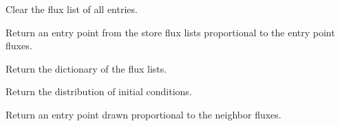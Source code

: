 \documentclass[letterpaper,10pt,english]{sphinxmanual}
\begin{document}
\begin{fulllineitems}
\begin{fulllineitems}
\end{fulllineitems}


\begin{fulllineitems}
\label{applications/applications.doc:window.window.clear_flux_list}
Clear the flux list of all entries.

\end{fulllineitems}


\begin{fulllineitems}
\label{applications/applications.doc:window.window.get_entry_point}
Return an entry point from the store flux lists proportional to the entry point fluxes.

\end{fulllineitems}


\begin{fulllineitems}
\label{applications/applications.doc:window.window.get_flux_lists}
Return the dictionary of the flux lists.

\end{fulllineitems}


\begin{fulllineitems}
\label{applications/applications.doc:window.window.get_initial_conditions}
Return the distribution of initial conditions.

\end{fulllineitems}


\begin{fulllineitems}
\label{applications/applications.doc:window.window.reinject}
Return an entry point drawn proportional to the neighbor fluxes.

\end{fulllineitems}



\end{fulllineitems}
\end{document}
